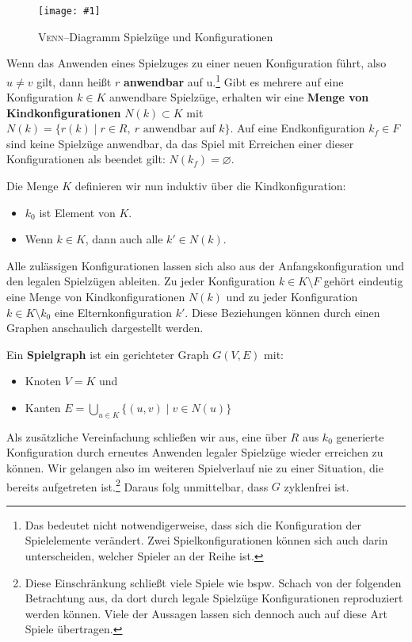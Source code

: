 \documentclass[a4paper,twoside]{scrartcl}
\let\emptyset\varnothing
\newcommand\g[3]{%
  \begin{figure}[!ht]
  \centering
  \texttt{[image: \#1]}
  \caption{#2}
  \end{figure}}
\begin{document}
\g{img/spielzuege.pdf}{\textsc{Venn}--Diagramm Spielzüge und Konfigurationen}{0.8}

Wenn das Anwenden eines Spielzuges zu einer neuen Konfiguration führt, also $u \neq v$ gilt, dann heißt $r$ \textbf{anwendbar} auf u.\footnote{Das bedeutet nicht notwendigerweise, dass sich die Konfiguration der Spielelemente verändert. Zwei Spielkonfigurationen können sich auch darin unterscheiden, welcher Spieler an der Reihe ist.} Gibt es mehrere auf eine Konfiguration $k \in K$ anwendbare Spielzüge, erhalten wir eine \textbf{Menge von Kindkonfigurationen} $N(k) \subset K$ mit $N(k) = \{r(k) \mid r \in R,~r \textrm{ anwendbar auf } k\}$. Auf eine Endkonfiguration $k_f \in F$ sind keine Spielzüge anwendbar, da das Spiel mit Erreichen einer dieser Konfigurationen als beendet gilt: $N(k_f) = \emptyset$.

Die Menge $K$ definieren wir nun induktiv über die Kindkonfiguration: 
\begin{itemize}
	\item $k_0$ ist Element von $K$.
	\item Wenn $k \in K$, dann auch alle $k' \in N(k)$.
\end{itemize}

Alle zulässigen Konfigurationen lassen sich also aus der Anfangskonfiguration und den legalen Spielzügen ableiten. Zu jeder Konfiguration $k \in K \setminus F$ gehört eindeutig eine Menge von Kindkonfigurationen $N(k)$ und zu jeder Konfiguration $k \in K \setminus k_0$ eine Elternkonfiguration $k'$. Diese Beziehungen können durch einen Graphen anschaulich dargestellt werden.

Ein \textbf{Spielgraph} ist ein gerichteter Graph $G(V,E)$ mit: 
\begin{itemize}
	\item Knoten $V = K$ und
	\item Kanten $E = \bigcup\limits_{u \in K}\{(u,v) \mid v \in N(u)\}$
\end{itemize}

Als zusätzliche Vereinfachung schließen wir aus, eine über $R$ aus $k_0$ generierte Konfiguration durch erneutes Anwenden legaler Spielzüge wieder erreichen zu können. Wir gelangen also im weiteren Spielverlauf nie zu einer Situation, die bereits aufgetreten ist.\footnote{Diese Einschränkung schließt viele Spiele wie bspw. Schach von der folgenden Betrachtung aus, da dort durch legale Spielzüge Konfigurationen reproduziert werden können. Viele der Aussagen lassen sich dennoch auch auf diese Art Spiele übertragen.} Daraus folg unmittelbar, dass $G$ zyklenfrei ist.
\end{document}
